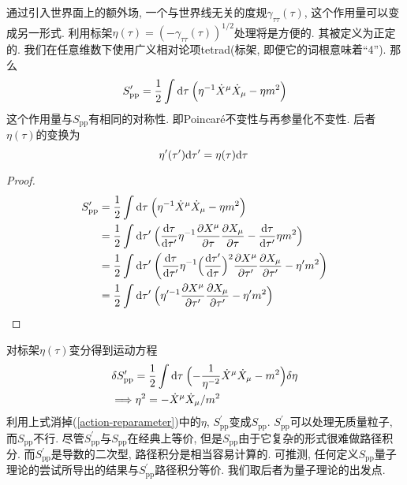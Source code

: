 通过引入世界面上的额外场, 一个与世界线无关的度规$\gamma_{\tau\tau}(\tau)$, 这个作用量可以变成另一形式. 利用标架$\eta(\tau)=(-\gamma_{\tau\tau}(\tau))^{1/2}$处理将是方便的. 其被定义为正定的. 我们在任意维数下使用广义相对论项tetrad(标架, 即便它的词根意味着``4''). 那么
\begin{equation}
S^\prime _{\mathrm{pp}}=\frac{1}{2}\int \mathrm{d}\tau\: \Bigl(\eta^{-1}\dot{X}^\mu \dot{X}_\mu-\eta m^2\Bigr) \label{action-reparameter}
\end{equation}
这个作用量与$S_{\mathrm{pp}}$有相同的对称性. 即Poincar\'{e}不变性与再参量化不变性. 后者$\eta(\tau)$的变换为
\begin{equation}
\eta^\prime(\tau^\prime)\mathrm{d}\tau^\prime=\eta(\tau)\mathrm{d}\tau\:
\end{equation}
\begin{tcolorbox}[breakable]
\begin{proof}
    \begin{align*}
        S^\prime _{\mathrm{pp}}&=\frac{1}{2}\int \mathrm{d}\tau\: \Bigl(\eta^{-1}\dot{X}^\mu \dot{X}_\mu-\eta m^2\Bigr) \nonumber \\
        &=\frac{1}{2}\int \mathrm{d}\tau^\prime \:\Bigl(\frac{\mathrm{d}\tau}{\mathrm{d}\tau^\prime} \eta^{-1}\frac{\partial X^\mu}{\partial \tau} \frac{\partial X_\mu}{\partial \tau}-\frac{\mathrm{d}\tau}{\mathrm{d}\tau^\prime} \eta m^2\Bigr) \nonumber \\
        &=\frac{1}{2}\int \mathrm{d}\tau^\prime\: \biggl(\frac{\mathrm{d}\tau}{\mathrm{d}\tau^\prime} \eta^{-1}\Bigl(\frac{\mathrm{d}\tau^\prime}{\mathrm{d}\tau}\Bigr)^2\frac{\partial X^\mu}{\partial \tau^\prime} \frac{\partial X_\mu}{\partial \tau^\prime}- \eta^\prime m^2\biggr) \nonumber \\
        &=\frac{1}{2}\int \mathrm{d}\tau^\prime\: \Bigl(\eta^{\prime -1}\frac{\partial X^\mu}{\partial \tau^\prime} \frac{\partial X_\mu}{\partial \tau^\prime}- \eta^\prime m^2\Bigr) \nonumber
        \end{align*}
\end{proof}
\end{tcolorbox}

对标架$\eta(\tau)$变分得到运动方程
\begin{align}
&\delta S_{\mathrm{pp}}^\prime =\frac{1}{2}\int \mathrm{d}\tau\:\Bigl(-\frac{1}{\eta^{-2}}\dot{X}^\mu\dot{X}_\mu-m^2\Bigr)\delta\eta \nonumber \\
&\Longrightarrow \eta^2=-\dot{X}^\mu\dot{X}_\mu/m^2 \label{1.2.7}
\end{align}
利用上式消掉(\ref{action-reparameter})中的$\eta$, $S_{\mathrm{pp}}^\prime$变成$S_{\mathrm{pp}}$. 
$S_{\mathrm{pp}}^\prime$可以处理无质量粒子, 而$S_{\mathrm{pp}}$不行. 
尽管$S_{\mathrm{pp}}^\prime$与$S_{\mathrm{pp}}$在经典上等价, 但是$S_{\mathrm{pp}}$由于它复杂的形式很难做路径积分. 而$S_{\mathrm{pp}}^\prime$是导数的二次型, 路径积分是相当容易计算的. 可推测, 任何定义$S_{\mathrm{pp}}$量子理论的尝试所导出的结果与$S_{\mathrm{pp}}^\prime$路径积分等价. 我们取后者为量子理论的出发点. 

